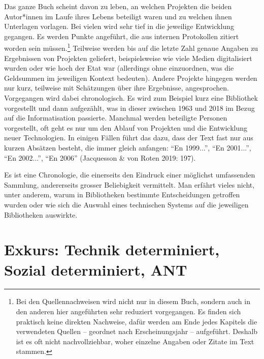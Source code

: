 \documentclass[a4paper,
fontsize=11pt,
oneside,
numbers=noperiodatend,
parskip=half-,
bibliography=totoc,
final
]{scrartcl}
\begin{document}
Das ganze Buch scheint davon zu leben, an welchen Projekten die beiden
Autor*innen im Laufe ihres Lebens beteiligt waren und zu welchen ihnen
Unterlagen vorlagen. Bei vielen wird sehr tief in die jeweilige
Entwicklung gegangen. Es werden Punkte angeführt, die aus internen
Protokollen zitiert worden sein müssen.\footnote{Bei den
  Quellennachweisen wird nicht nur in diesem Buch, sondern auch in den
  anderen hier angeführten sehr reduziert vorgegangen. Es finden sich
  praktisch keine direkten Nachweise, dafür werden am Ende jedes
  Kapitels die verwendeten Quellen -- geordnet nach Erscheinungsjahr --
  aufgeführt. Deshalb ist es oft nicht nachvollziehbar, woher einzelne
  Angaben oder Zitate im Text stammen.} Teilweise werden bis auf die
letzte Zahl genaue Angaben zu Ergebnissen von Projekten geliefert,
beispielsweise wie viele Medien digitalisiert wurden oder wie hoch der
Etat war (allerdings ohne einzuordnen, was die Geldsummen im jeweiligen
Kontext bedeuten). Andere Projekte hingegen werden nur kurz, teilweise
mit Schätzungen über ihre Ergebnisse, angesprochen. Vorgegangen wird
dabei chronologisch. Es wird zum Beispiel kurz eine Bibliothek
vorgestellt und dann aufgezählt, was in dieser zwischen 1963 und 2018 im
Bezug auf die Informatisation passierte. Manchmal werden beteiligte
Personen vorgestellt, oft geht es nur um den Ablauf von Projekten und
die Entwicklung neuer Technologien. In einigen Fällen führt das dazu,
dass der Text fast nur aus kurzen Absätzen besteht, die immer gleich
anfangen: \enquote{En 1999...}, \enquote{En 2001...}, \enquote{En
2002...}, \enquote{En 2006} (Jacquesson \& von Roten 2019: 197).

Es ist eine Chronologie, die einerseits den Eindruck einer möglichst
umfassenden Sammlung, andererseits grosser Beliebigkeit vermittelt. Man
erfährt vieles nicht, unter anderem, warum in Bibliotheken bestimmte
Entscheidungen getroffen wurden oder wie sich die Auswahl eines
technischen Systems auf die jeweiligen Bibliotheken auswirkte.

\hypertarget{exkurs-technik-determiniert-sozial-determiniert-ant}{%
\section{Exkurs: Technik determiniert, Sozial determiniert,
ANT}\label{exkurs-technik-determiniert-sozial-determiniert-ant}}
\end{document}
